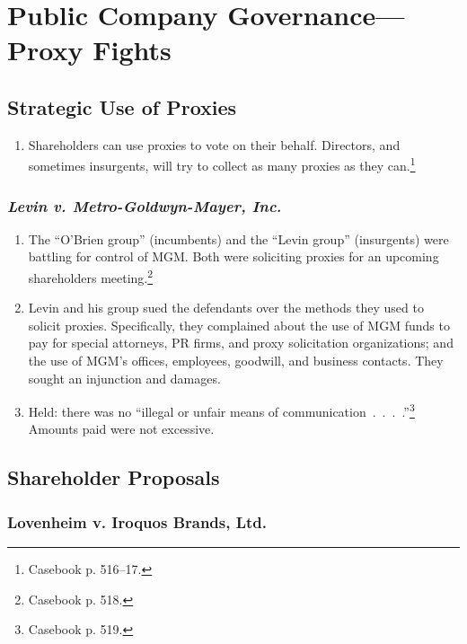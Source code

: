 \section{Public Company Governance---Proxy Fights}

\subsection{Strategic Use of Proxies}

\begin{enumerate}
    \item Shareholders can use proxies to vote on their behalf. Directors, and 
    sometimes insurgents, will try to collect as many proxies as they 
    can.\footnote{Casebook p. 516--17.}
\end{enumerate}

\subsubsection{\emph{Levin v. Metro-Goldwyn-Mayer, Inc.}}

\begin{enumerate}
    \item The ``O'Brien group'' (incumbents) and the ``Levin group'' 
    (insurgents) were battling for control of MGM. Both were soliciting proxies 
    for an upcoming shareholders meeting.\footnote{Casebook p. 518.}
    \item Levin and his group sued the defendants over the methods they used to 
    solicit proxies. Specifically, they complained about the use of MGM funds to 
    pay for special attorneys, PR firms, and proxy solicitation organizations; 
    and the use of MGM's offices, employees, goodwill, and business contacts. 
    They sought an injunction and damages.
    \item Held: there was no ``illegal or unfair means of 
    communication~.~.~.~.''\footnote{Casebook p. 519.} Amounts paid were not 
    excessive.
\end{enumerate}

\subsection{Shareholder Proposals}

\subsubsection{Lovenheim v. Iroquos Brands, Ltd.}

